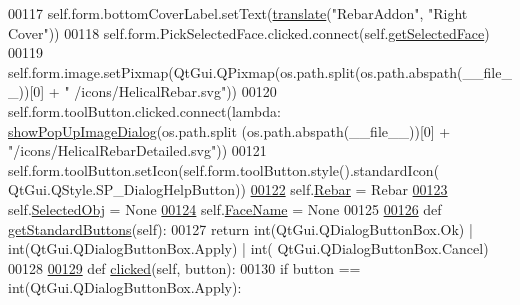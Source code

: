 \begin{DoxyCode}
00117             self.form.bottomCoverLabel.setText(\hyperlink{namespaceRebarfunc_a1467a55852e36c36c472e222855bb937}{translate}(\textcolor{stringliteral}{"RebarAddon"}, \textcolor{stringliteral}{"Right Cover"}))
00118         self.form.PickSelectedFace.clicked.connect(self.\hyperlink{classHelicalRebar_1_1__HelicalRebarTaskPanel_aea514ce88bde89c57ab88576e7a27230}{getSelectedFace})
00119         self.form.image.setPixmap(QtGui.QPixmap(os.path.split(os.path.abspath(\_\_file\_\_))[0] + \textcolor{stringliteral}{"
      /icons/HelicalRebar.svg"}))
00120         self.form.toolButton.clicked.connect(\textcolor{keyword}{lambda}: \hyperlink{namespacePopUpImage_a8c565620d7de9b4882a44eacb870ad05}{showPopUpImageDialog}(os.path.split
      (os.path.abspath(\_\_file\_\_))[0] + \textcolor{stringliteral}{"/icons/HelicalRebarDetailed.svg"}))
00121         self.form.toolButton.setIcon(self.form.toolButton.style().standardIcon(
      QtGui.QStyle.SP\_DialogHelpButton))
\hypertarget{HelicalRebar_8py_source.tex_l00122}{}\hyperlink{classHelicalRebar_1_1__HelicalRebarTaskPanel_a18e1b46858c6d4ca5f6925d69ea15807}{00122}         self.\hyperlink{classHelicalRebar_1_1__HelicalRebarTaskPanel_a18e1b46858c6d4ca5f6925d69ea15807}{Rebar} = Rebar
\hypertarget{HelicalRebar_8py_source.tex_l00123}{}\hyperlink{classHelicalRebar_1_1__HelicalRebarTaskPanel_a6666e765dc0ac4e8bd4d5c1825862795}{00123}         self.\hyperlink{classHelicalRebar_1_1__HelicalRebarTaskPanel_a6666e765dc0ac4e8bd4d5c1825862795}{SelectedObj} = \textcolor{keywordtype}{None}
\hypertarget{HelicalRebar_8py_source.tex_l00124}{}\hyperlink{classHelicalRebar_1_1__HelicalRebarTaskPanel_ac6f5e0df8c90110fdcb82cb9725ae6b6}{00124}         self.\hyperlink{classHelicalRebar_1_1__HelicalRebarTaskPanel_ac6f5e0df8c90110fdcb82cb9725ae6b6}{FaceName} = \textcolor{keywordtype}{None}
00125 
\hypertarget{HelicalRebar_8py_source.tex_l00126}{}\hyperlink{classHelicalRebar_1_1__HelicalRebarTaskPanel_aef7b43bb1c81a0d21bd80cfbe56229bf}{00126}     \textcolor{keyword}{def }\hyperlink{classHelicalRebar_1_1__HelicalRebarTaskPanel_aef7b43bb1c81a0d21bd80cfbe56229bf}{getStandardButtons}(self):
00127         \textcolor{keywordflow}{return} int(QtGui.QDialogButtonBox.Ok) | int(QtGui.QDialogButtonBox.Apply) | int(
      QtGui.QDialogButtonBox.Cancel)
00128 
\hypertarget{HelicalRebar_8py_source.tex_l00129}{}\hyperlink{classHelicalRebar_1_1__HelicalRebarTaskPanel_ab0b70379d225d10e3585478005fc53ce}{00129}     \textcolor{keyword}{def }\hyperlink{classHelicalRebar_1_1__HelicalRebarTaskPanel_ab0b70379d225d10e3585478005fc53ce}{clicked}(self, button):
00130         \textcolor{keywordflow}{if} button == int(QtGui.QDialogButtonBox.Apply):

\end{DoxyCode}
